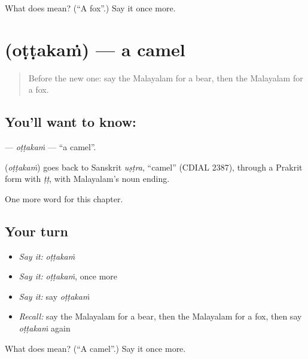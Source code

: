 \begin{tcolorbox}[breakable,colback=teal!4,colframe=teal!35!black,title={Before you move on}]
What does  mean? (\textquotedblleft{}A fox\textquotedblright{}.) Say it once more.
\end{tcolorbox}
\section[\texorpdfstring{\ml{ഒട്ടകം} (oṭṭakaṁ)}{ഒട്ടകം (oṭṭakaṁ)}]{ (oṭṭakaṁ) — a camel}

\label{lesson:ML-C162-ottakam}



\begin{quote}
Before the new one: say the Malayalam for a bear, then the Malayalam for a fox.
\end{quote}

\subsection*{You'll want to know: }
\textbf{} — \emph{oṭṭakaṁ} — \textquotedblleft{}a camel\textquotedblright{}.

\begin{cousinweb}
\textbf{} (\emph{oṭṭakaṁ}) goes back to Sanskrit \emph{uṣṭra}, \textquotedblleft{}camel\textquotedblright{} (CDIAL 2387), through a Prakrit form with \emph{ṭṭ}, with Malayalam's noun ending.
\end{cousinweb}

\begin{grammarlens}[title={What you've built}]
One more word for this chapter.
\end{grammarlens}

\subsection*{Your turn}
\begin{itemize}
\raggedright
  \item \emph{Say it:} \emph{oṭṭakaṁ}
  \item \emph{Say it:} \emph{oṭṭakaṁ}, once more
  \item \emph{Say it:} say \emph{oṭṭakaṁ}
  \item \emph{Recall:} say the Malayalam for a bear, then the Malayalam for a fox, then say \emph{oṭṭakaṁ} again
\end{itemize}

\begin{tcolorbox}[breakable,colback=teal!4,colframe=teal!35!black,title={Before you move on}]
What does  mean? (\textquotedblleft{}A camel\textquotedblright{}.) Say it once more.
\end{tcolorbox}
